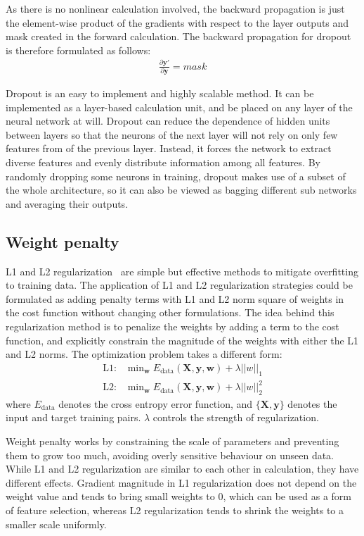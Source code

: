 \documentclass{article}
\begin{document}
As there is no nonlinear calculation involved, the backward propagation is just the element-wise product of the gradients with respect to the layer outputs and mask created in the forward calculation. 
The backward propagation for dropout is therefore formulated as follows:
\begin{align}
    \frac{\partial \bm{y}'}{\partial \bm{y}} = mask
\end{align}

Dropout is an easy to implement and highly scalable method. 
It can be implemented as a layer-based calculation unit, and be placed on any layer of the neural network at will. 
Dropout can reduce the dependence of hidden units between layers so that the neurons of the next layer will not rely on only few features from of the previous layer.
Instead, it forces the network to extract diverse features and evenly distribute information among all features. 
By randomly dropping some neurons in training, dropout makes use of a subset of the whole architecture, so it can also be viewed as bagging different sub networks and averaging their outputs.


\subsection{Weight penalty}

L1 and L2 regularization~\cite{ng2004feature} are simple but effective methods to mitigate overfitting to training data. 
The application of L1 and L2 regularization strategies could be formulated as adding penalty terms with L1 and L2 norm square of weights in the cost function without changing other formulations. 
The idea behind this regularization method is to penalize the weights by adding a term to the cost function, and explicitly constrain the magnitude of the weights with either the L1 and L2 norms.
The optimization problem takes a different form:
\begin{align}
    \text{L1: } & \text{min}_{\bm{w}} \; E_{\text{data}}(\bm{X}, \bm{y}, \bm{w}) + \lambda ||w||_1\\
    \text{L2: } & \text{min}_{\bm{w}} \; E_{\text{data}}(\bm{X}, \bm{y}, \bm{w}) + \lambda ||w||^2_2
\end{align}
where $E_{\text{data}}$ denotes the cross entropy error function, and $\{\bm{X}, \bm{y}\}$ denotes the input and target training pairs. 
$\lambda$ controls the strength of regularization.

Weight penalty works by constraining the scale of parameters and preventing them to grow too much, avoiding overly sensitive behaviour on unseen data.
While L1 and L2 regularization are similar to each other in calculation, they have different effects.
Gradient magnitude in L1 regularization does not depend on the weight value and tends to bring small weights to 0, which can be used as a form of feature selection, whereas L2 regularization tends to shrink the weights to a smaller scale uniformly. 
\end{document}
